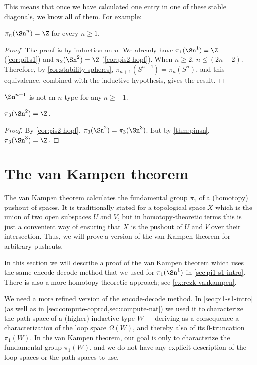 {This means that once we have calculated one entry in one of these stable
diagonals, we know all of them.  For example:
\begin{thm}\label{thm:pinsn}
$\pi_n(\Sn^n)=\Z$ for every $n\geq 1$.
\end{thm}

\begin{proof}
The proof is by induction on $n$.  We already have $\pi_1(\Sn ^1) = \Z$
(\cref{cor:pi1s1}) and $\pi_2(\Sn ^2) = \Z$ (\cref{cor:pis2-hopf}).
When $n \ge 2$, $n \le (2n - 2)$. Therefore, by
\cref{cor:stability-spheres}, $\pi_{n+1}(S^{n+1}) = \pi_{n}(S^{n})$, and
this equivalence, combined with the inductive hypothesis, gives the result.
\end{proof}

\begin{cor}
  $\Sn^{n+1}$ is not an $n$-type for any $n\ge -1$.
\end{cor}

\begin{cor}\label{thm:pi3s2}
  $\pi_3(\Sn^2)=\Z$.
\end{cor}
\begin{proof}
  By \cref{cor:pis2-hopf}, $\pi_3(\Sn^2) = \pi_3(\Sn^3)$.
  But by \cref{thm:pinsn}, $\pi_3(\Sn^3) = \Z$.
\end{proof}

\section{The van Kampen theorem}
\label{sec:van-kampen}

%
%

%
The van Kampen theorem calculates the fundamental group $\pi_1$ of a (homotopy) pushout of spaces.
It is traditionally stated for a topological space $X$ which is the union of two open subspaces $U$ and $V$, but in homotopy-theoretic terms this is just a convenient way of ensuring that $X$ is the pushout of $U$ and $V$ over their intersection.
Thus, we will prove a version of the van Kampen theorem for arbitrary pushouts.

In this section we will describe a proof of the van Kampen theorem which uses the same encode-decode method that we used for $\pi_1(\Sn^1)$ in \cref{sec:pi1-s1-intro}.
There is also a more homotopy-theoretic approach; see \cref{ex:rezk-vankampen}.

We need a more refined version of the encode-decode method.
In \cref{sec:pi1-s1-intro} (as well as in \cref{sec:compute-coprod,sec:compute-nat}) we used it to characterize the path space of a (higher) inductive type $W$ --- deriving as a consequence a characterization of the loop space $\Omega(W)$, and thereby also of its 0-truncation $\pi_1(W)$.
In the van Kampen theorem, our goal is only to characterize the fundamental group $\pi_1(W)$, and we do not have any explicit description of the loop spaces or the path spaces to use.

}
